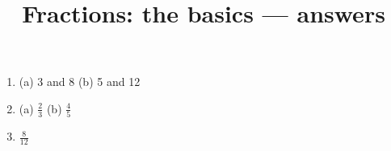 \documentclass[12pt]{article}
\begin{document}

\title{Fractions: the basics --- answers}
\date{}
\maketitle

\begin{enumerate}[label=\textbf{Q\arabic*.}]
\item (a) 3 and 8 \quad (b) 5 and 12
\item (a) \( \frac{2}{3} \) \quad (b) \( \frac{4}{5} \)
\item \( \frac{8}{12} \)
\end{enumerate}
\end{document}
